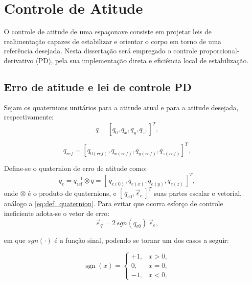 \section{Controle de Atitude}
O controle de atitude de uma espaçonave consiste em projetar leis de realimentação capazes de estabilizar e orientar o corpo em torno de uma referência desejada.
Nesta dissertação será empregado o controle proporcional-derivativo (PD), pela sua implementação direta e eficiência local de estabilização.

\subsection{Erro de atitude e lei de controle PD}
Sejam os quaternions unitários para a atitude atual e para a atitude desejada, respectivamente:
\begin{equation}
q = [q_0,q_x,q_y,q_z,]^T,
\end{equation}

\begin{equation}
q_{ref} = [q_{0(ref)},q_{x(ref)},q_{y(ref)},q_{z(ref)}]^T,
\end{equation}

Define-se o quaternion de erro de atitude como:
\begin{equation}
q_e = q_{\mathrm{ref}}^{-1} \otimes q =
[\,q_{e(0)},q_{e(x)},q_{e(y)},q_{e(z)}\,]^T,
\label{eq:definicao_quaternion_erro}
\end{equation}
onde $\otimes$ é o produto de quaternions, e $[\,q_{e0},\vec\epsilon_e\,]^T$ suas partes escalar e vetorial, análogo a \eqref{eq:def_quaternion}.
Para evitar que ocorra esforço de controle ineficiente adota-se o vetor de erro:
\begin{equation}
\vec e_q = 2\,sgn(q_{e0})\,\vec\epsilon_e,
\label{eq:erro_quaternion_vetorial}
\end{equation}

em que $sgn(\cdot)$ é a função sinal, podendo se tornar um dos casos a seguir:

\begin{equation}
\operatorname{sgn}(x) =
\begin{cases}
+1, & x > 0, \\
0,  & x = 0, \\
-1, & x < 0,
\end{cases}
\label{eq:casos_funcao_sinal}
\end{equation}

